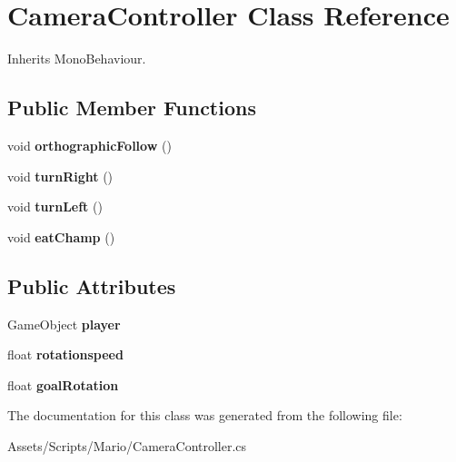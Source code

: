 \hypertarget{class_camera_controller}{\section{Camera\-Controller Class Reference}
\label{class_camera_controller}
}


Inherits Mono\-Behaviour.

\subsection*{Public Member Functions}
\begin{DoxyCompactItemize}
\item 
\hypertarget{class_camera_controller_ac0848a51a29a544330e53284f7dee483}{void {\bfseries orthographic\-Follow} ()}\label{class_camera_controller_ac0848a51a29a544330e53284f7dee483}

\item 
\hypertarget{class_camera_controller_ace2379f21f35d3f1da6d547125fbc967}{void {\bfseries turn\-Right} ()}\label{class_camera_controller_ace2379f21f35d3f1da6d547125fbc967}

\item 
\hypertarget{class_camera_controller_a99c09bb8742b3651190749f6443028f8}{void {\bfseries turn\-Left} ()}\label{class_camera_controller_a99c09bb8742b3651190749f6443028f8}

\item 
\hypertarget{class_camera_controller_a408c0ee4833bd0ba7572dcb2fd0e61d4}{void {\bfseries eat\-Champ} ()}\label{class_camera_controller_a408c0ee4833bd0ba7572dcb2fd0e61d4}

\end{DoxyCompactItemize}
\subsection*{Public Attributes}
\begin{DoxyCompactItemize}
\item 
\hypertarget{class_camera_controller_aae794ec2d17947f671ce0eaef9aac8b7}{Game\-Object {\bfseries player}}\label{class_camera_controller_aae794ec2d17947f671ce0eaef9aac8b7}

\item 
\hypertarget{class_camera_controller_aa8cc1964543f77e2c1ef7a424d88f18e}{float {\bfseries rotationspeed}}\label{class_camera_controller_aa8cc1964543f77e2c1ef7a424d88f18e}

\item 
\hypertarget{class_camera_controller_acd2a2d37228f33efd72a17763d057d30}{float {\bfseries goal\-Rotation}}\label{class_camera_controller_acd2a2d37228f33efd72a17763d057d30}

\end{DoxyCompactItemize}


The documentation for this class was generated from the following file\-:\begin{DoxyCompactItemize}
\item 
Assets/\-Scripts/\-Mario/Camera\-Controller.\-cs\end{DoxyCompactItemize}
